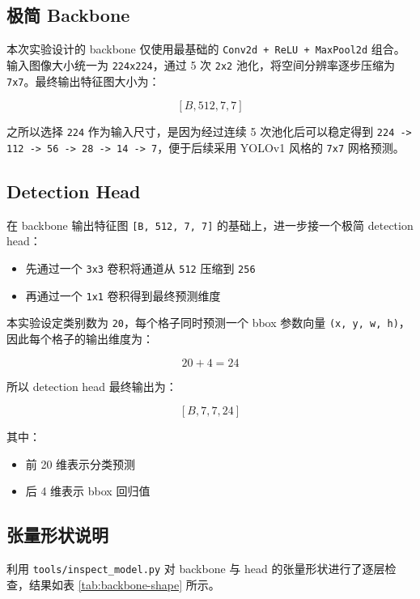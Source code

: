 \documentclass[11pt,a4paper]{article}
\begin{document}
\subsection{极简 Backbone}

本次实验设计的 backbone 仅使用最基础的 \texttt{Conv2d + ReLU + MaxPool2d} 组合。输入图像大小统一为 \texttt{224x224}，通过 5 次 \texttt{2x2} 池化，将空间分辨率逐步压缩为 \texttt{7x7}。最终输出特征图大小为：

\[
[B, 512, 7, 7]
\]

之所以选择 \texttt{224} 作为输入尺寸，是因为经过连续 5 次池化后可以稳定得到 \texttt{224 -> 112 -> 56 -> 28 -> 14 -> 7}，便于后续采用 YOLOv1 风格的 \texttt{7x7} 网格预测。

\subsection{Detection Head}

在 backbone 输出特征图 \texttt{[B, 512, 7, 7]} 的基础上，进一步接一个极简 detection head：

\begin{itemize}
  \item 先通过一个 \texttt{3x3} 卷积将通道从 \texttt{512} 压缩到 \texttt{256}
  \item 再通过一个 \texttt{1x1} 卷积得到最终预测维度
\end{itemize}

本实验设定类别数为 \texttt{20}，每个格子同时预测一个 bbox 参数向量 \texttt{(x, y, w, h)}，因此每个格子的输出维度为：

\[
20 + 4 = 24
\]

所以 detection head 最终输出为：

\[
[B, 7, 7, 24]
\]

其中：

\begin{itemize}
  \item 前 20 维表示分类预测
  \item 后 4 维表示 bbox 回归值
\end{itemize}

\subsection{张量形状说明}

利用 \texttt{tools/inspect\_model.py} 对 backbone 与 head 的张量形状进行了逐层检查，结果如表 \ref{tab:backbone-shape} 所示。
\end{document}
